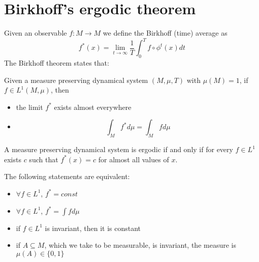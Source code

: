 \section{Birkhoff's ergodic theorem}
Given an observable $f:M\rightarrow M$ we define the Birkhoff (time) average as
$$
	f^*(x) = \lim_{t\rightarrow \infty} \frac{1}{T}\int_0^T f\circ \phi^t(x)dt
$$
The Birkhoff theorem states that:
\begin{prop}
	Given a measure preserving dynamical system $(M,\mu,T)$ with $\mu(M)=1$, if $f\in L^1(M,\mu)$, then 
	\begin{itemize}
		\item the limit $f^*$ exists almost everywhere
		\item 
			$$
				\int_M f^* d\mu = \int_M f d\mu
			$$
	\end{itemize}
\end{prop}
\begin{definition}
	A measure preserving dynamical system is ergodic if and only if for every $f\in L^1$ exists $c$ such that $f^*(x) = c$ for almost all values of $x$. 
\end{definition}
\begin{prop}
	The following statements are equivalent:
	\begin{itemize}
		\item $\forall f\in L^1$, $f^* = const$	
		\item $\forall f\in L^1$, $f^* = \int f d\mu$
		\item if $f \in L^1$ is invariant, then it is constant
		\item if $A \subseteq M$, which we take to be measurable, is invariant, the measure is $\mu(A) \in \{0,1\}$
	\end{itemize}
\end{prop}
